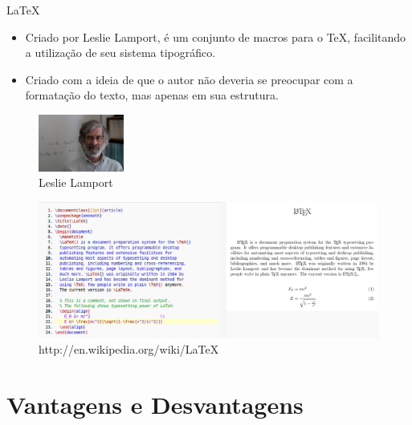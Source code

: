 \documentclass [11pt, a4paper]{beamer}
\begin{document}
\begin{frame}{\LaTeX{}}
    \begin{itemize}
        \item Criado por Leslie Lamport, é um conjunto de macros para o \TeX{}, facilitando a utilização de seu sistema tipográfico.
        \item Criado com a ideia de que o autor não deveria se preocupar com a formatação do texto, mas apenas em sua estrutura.
    \end{itemize}
    \begin{figure}[htbp]
    \centering
    \includegraphics[width=0.25\textwidth]{Figures/leslie.jpeg}
    \caption{Leslie Lamport}
    \label{fig:leslie}
\end{figure}
\end{frame}

\begin{frame}
\begin{figure}[htbp]
    \centering
        \includegraphics[width=1\textwidth]{Figures/output.png}
    \caption{http://en.wikipedia.org/wiki/LaTeX}
    \label{fig:output}
\end{figure}
\end{frame}

\section{Vantagens e Desvantagens}
\end{document}
